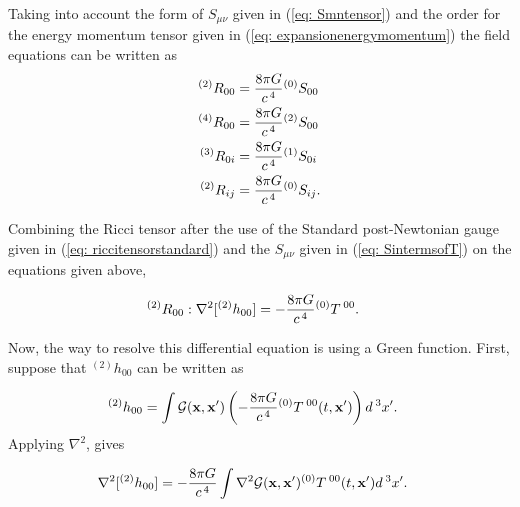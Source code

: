 Taking into account the form of $S_{\mu\nu}$ given in (\ref{eq: Smntensor}) and the order for the energy momentum tensor given in (\ref{eq: expansionenergymomentum}) the field equations can be written as
\begin{subequations}
\begin{align}
^{(2)}R_{00} &= \frac{8\pi G}{c^{\hspace{0.05cm}4}}{}^{(0)}S_{00}\\
^{(4)}R_{00} &= \frac{8\pi G}{c^{\hspace{0.05cm}4}}{}^{(2)}S_{00}\\
^{(3)}R_{0i} &= \frac{8\pi G}{c^{\hspace{0.05cm}4}}{}^{(1)}S_{0i}\\
^{(2)}R_{ij} &= \frac{8\pi G}{c^{\hspace{0.05cm}4}}{}^{(0)}S_{ij}.
\end{align}
\end{subequations}

Combining the Ricci tensor after the use of the Standard post-Newtonian gauge given in (\ref{eq: riccitensorstandard}) and the $S_{\mu\nu}$ given in (\ref{eq: SintermsofT}) on the equations given above,

\begin{align}
\label{eq: R00approx}
&^{(2)}R_{00}: \nabla^2[^{(2)}h_{00}] = -\frac{8\pi G}{c^{\hspace{0.05cm}4}}{}^{(0)}T{}^{\hspace{0.07cm}00}.
\end{align}

Now, the way to resolve this differential equation is using a Green function. First, suppose that $^{(2)}h_{00}$ can be written as

\begin{align}
&^{(2)}h_{00} = \int \mathcal{G}(\mathbf{x},\mathbf{x'})\left(-\frac{8\pi G}{c^{\hspace{0.05cm}4}}{}^{(0)}T{}^{\hspace{0.07cm}00}(t,\mathbf{x'})\right)d^{\hspace{0.07cm}3}x'.
\end{align}
Applying $\nabla^2$, gives

\begin{align}
&\nabla^2[^{(2)}h_{00}] = -\frac{8\pi G}{c^{\hspace{0.05cm}4}} \int \nabla^{2}{}\mathcal{G}(\mathbf{x},\mathbf{x'}){}^{(0)}T{}^{\hspace{0.07cm}00}(t,\mathbf{x'})d^{\hspace{0.07cm}3}x'.
\end{align}


